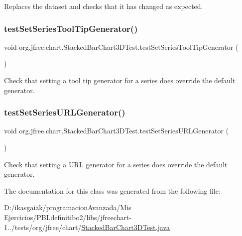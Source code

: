 Replaces the dataset and checks that it has changed as expected. \mbox{\label{classorg_1_1jfree_1_1chart_1_1_stacked_bar_chart3_d_test_a00148f8fe1cbb792a61c74d391e26c01}} 
\subsubsection{\texorpdfstring{test\+Set\+Series\+Tool\+Tip\+Generator()}{testSetSeriesToolTipGenerator()}}
{\footnotesize\ttfamily void org.\+jfree.\+chart.\+Stacked\+Bar\+Chart3\+D\+Test.\+test\+Set\+Series\+Tool\+Tip\+Generator (\begin{DoxyParamCaption}{ }\end{DoxyParamCaption})}

Check that setting a tool tip generator for a series does override the default generator. \mbox{\label{classorg_1_1jfree_1_1chart_1_1_stacked_bar_chart3_d_test_a7287dacb964113d8d0efb7755dca0195}} 
\subsubsection{\texorpdfstring{test\+Set\+Series\+U\+R\+L\+Generator()}{testSetSeriesURLGenerator()}}
{\footnotesize\ttfamily void org.\+jfree.\+chart.\+Stacked\+Bar\+Chart3\+D\+Test.\+test\+Set\+Series\+U\+R\+L\+Generator (\begin{DoxyParamCaption}{ }\end{DoxyParamCaption})}

Check that setting a U\+RL generator for a series does override the default generator. 

The documentation for this class was generated from the following file\+:\begin{DoxyCompactItemize}
\item 
D\+:/ikasgaiak/programacion\+Avanzada/\+Mis Ejercicios/\+P\+B\+Ldefinitibo2/libs/jfreechart-\/1../tests/org/jfree/chart/\mbox{\hyperlink{_stacked_bar_chart3_d_test_8java}{Stacked\+Bar\+Chart3\+D\+Test.\+java}}\end{DoxyCompactItemize}
